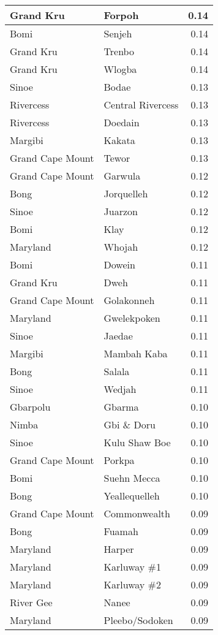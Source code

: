 \documentclass[
]{article}
\begin{document}
\begin{tabular}[t]{l|l|r}
Grand Kru & Forpoh & 0.14\\
\hline
Bomi & Senjeh & 0.14\\
\hline
Grand Kru & Trenbo & 0.14\\
\hline
Grand Kru & Wlogba & 0.14\\
\hline
Sinoe & Bodae & 0.13\\
\hline
Rivercess & Central Rivercess & 0.13\\
\hline
Rivercess & Doedain & 0.13\\
\hline
Margibi & Kakata & 0.13\\
\hline
Grand Cape Mount & Tewor & 0.13\\
\hline
Grand Cape Mount & Garwula & 0.12\\
\hline
Bong & Jorquelleh & 0.12\\
\hline
Sinoe & Juarzon & 0.12\\
\hline
Bomi & Klay & 0.12\\
\hline
Maryland & Whojah & 0.12\\
\hline
Bomi & Dowein & 0.11\\
\hline
Grand Kru & Dweh & 0.11\\
\hline
Grand Cape Mount & Golakonneh & 0.11\\
\hline
Maryland & Gwelekpoken & 0.11\\
\hline
Sinoe & Jaedae & 0.11\\
\hline
Margibi & Mambah Kaba & 0.11\\
\hline
Bong & Salala & 0.11\\
\hline
Sinoe & Wedjah & 0.11\\
\hline
Gbarpolu & Gbarma & 0.10\\
\hline
Nimba & Gbi \& Doru & 0.10\\
\hline
Sinoe & Kulu Shaw Boe & 0.10\\
\hline
Grand Cape Mount & Porkpa & 0.10\\
\hline
Bomi & Suehn Mecca & 0.10\\
\hline
Bong & Yeallequelleh & 0.10\\
\hline
Grand Cape Mount & Commonwealth & 0.09\\
\hline
Bong & Fuamah & 0.09\\
\hline
Maryland & Harper & 0.09\\
\hline
Maryland & Karluway \#1 & 0.09\\
\hline
Maryland & Karluway \#2 & 0.09\\
\hline
River Gee & Nanee & 0.09\\
\hline
Maryland & Pleebo/Sodoken & 0.09\\

\end{tabular}
\end{document}
